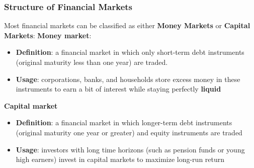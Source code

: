 \documentclass[aspectratio=169]{beamer}
\begin{document}
\begin{frame}
\frametitle{Structure of Financial Markets}

Most financial markets can be classified as either \textbf{Money Markets} or \textbf{Capital Markets}: 
\smallskip 
\textbf{Money market}:
\begin{itemize} 
    \item \textbf{Definition}: a financial market in which only short-term debt instruments (original maturity less than one year) are traded. 
    \item \textbf{Usage}: corporations, banks, and households store excess money in these instruments to earn a bit of interest while staying perfectly \textbf{liquid} 
\end{itemize}
\smallskip 
\textbf{Capital market}
\begin{itemize} 
    \item \textbf{Definition}: a financial market in which longer-term debt instruments (original maturity one year or greater) and equity instruments are traded
    \item \textbf{Usage}: investors with long time horizons (such as pension funds or young high earners) invest in capital markets to maximize long-run return 
\end{itemize}


\end{frame}
\end{document}
